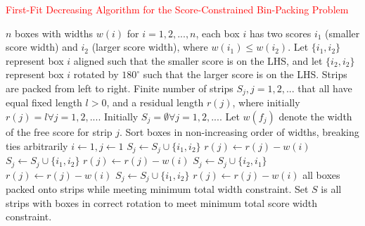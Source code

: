 \documentclass[oribibl]{llncs}
\begin{document}
\begin{algorithm}[H]
	\caption{\textcolor{red}{First-Fit Decreasing Algorithm for the Score-Constrained Bin-Packing Problem}}
	\label{alg:ffdapprox}
	\begin{algorithmic}[1]
	\Require $n$ boxes with widths $w(i)$ for $i = 1,2,...,n$, each box $i$ has two scores $i_1$ (smaller score width) and $i_2$ (larger score width), where $w(i_1) \leq w(i_2)$. Let $\{i_1, i_2\}$ represent box $i$ aligned such that the smaller score is on the LHS, and let $\{i_2, i_2\}$ represent box $i$ rotated by $180^{\circ}$ such that the larger score is on the LHS. Strips are packed from left to right. Finite number of strips $S_j, j = 1, 2, ...$ that all have equal fixed length $l > 0$, and a residual length $r(j)$, where initially $r(j) = l \forall j = 1, 2, ...$. Initially $S_j = \emptyset \forall j = 1, 2,...$. Let $w(f_j)$ denote the width of the free score for strip $j$.   
	\State Sort boxes in non-increasing order of widths, breaking ties arbitrarily
	\State $i \gets 1, j \gets 1$
	\State $S_j \gets S_j \cup \{i_1, i_2\}$
	\State $r(j) \gets r(j) - w(i)$
					\State $S_j \gets S_j \cup \{i_1, i_2\}$
					\State $r(j) \gets r(j) - w(i)$
					\State \Break
					\State $S_j \gets S_j \cup \{i_2, i_1\}$
					\State $r(j) \gets r(j) - w(i)$
					\State \Break					
				\EndIf
				\State $S_j \gets S_j \cup \{i_1, i_2\}$
				\State $r(j) \gets r(j) - w(i)$
				\State \Break
			\EndIf
		\EndFor
	\EndFor		
	\Ensure all boxes packed onto strips while meeting minimum total width constraint. Set $S$ is all strips with boxes in correct rotation to meet minimum total score width constraint.	
	\end{algorithmic}	
\end{algorithm}
\end{document}
